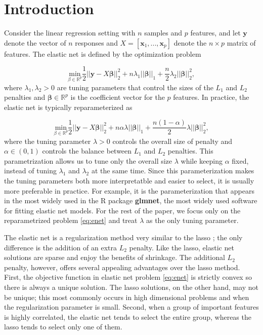\section{Introduction}

Consider the linear regression setting with $n$ samples and $p$ features, and let $\boldsymbol y$ denote the vector of $n$ responses and $X=[\boldsymbol x_1,...,\boldsymbol x_p]$ denote the $n\times p$ matrix of features. The elastic net \citep{zou2005} is defined by the optimization problem 

\begin{equation}
    \label{eq:enet0}
    \underset{\beta\in \mathbb{R}^p}{\mathrm{min}}\frac{1}{2}||\boldsymbol y-X\boldsymbol\beta||_2^2+n\lambda_1||\boldsymbol\beta||_1+\frac{n}{2}\lambda_2||\boldsymbol\beta||_2^2,
\end{equation}
where $\lambda_1,\lambda_2> 0$ are tuning parameters that control the sizes of the $L_1$ and $L_2$ penalties and $\boldsymbol\beta\in\mathbb{R}^p$ is the coefficient vector for the $p$ features. In practice, the elastic net is typically reparameterized as

\begin{equation}
    \label{eq:enet}
    \underset{\beta\in \mathbb{R}^p}{\mathrm{min}}\frac{1}{2}||\boldsymbol y-X\boldsymbol\beta||_2^2+n\alpha\lambda||\boldsymbol\beta||_1+\frac{n(1-\alpha)}{2}\lambda||\boldsymbol\beta||_2^2,
\end{equation}
where the tuning parameter $\lambda>0$ controls the overall size of penalty and $\alpha\in(0,1)$ controls the balance between $L_1$ and $L_2$ penalties. This parametrization allows us to tune only the overall size $\lambda$ while keeping $\alpha$ fixed, instead of tuning $\lambda_1$ and $\lambda_2$ at the same time. Since this parameterization makes the tuning parameters both more interpretatble and easier to select, it is usually more preferable in practice. For example, it is the parameterization that appears in the most widely used in the R package \textbf{glmnet}, the most widely used software for fitting elastic net models. For the rest of the paper, we focus only on the reparametrized problem \eqref{eq:enet} and treat $\lambda$ as the only tuning parameter.

The elastic net is a regularization method very similar to the lasso \citep{tibshirani1996}; the only difference is the addition of an extra $L_2$ penalty. Like the lasso, elastic net solutions are sparse and enjoy the benefits of shrinkage. The additional $L_2$ penalty, however, offers several appealing advantages over the lasso method. First, the objective function in elastic net problem \eqref{eq:enet} is strictly convex so there is always a unique solution. The lasso solutions, on the other hand, may not be unique; this most commonly occurs in high dimensional problems and when the regularization parameter is small. Second, when a group of important features is highly correlated, the elastic net tends to select the entire group, whereas the lasso tends to select only one of them.

